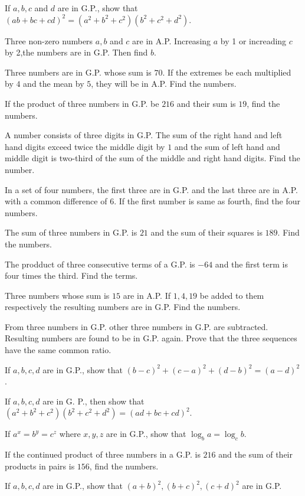 \item If $a, b, c$ and $d$ are in G.P., show that $(ab + bc + cd)^2 = (a^2 + b^2 + c^2)(b^2 + c^2 + d^2)$.
\item Three non-zero numbers $a, b$ and $c$ are in A.P. Increasing $a$ by 1 or increading $c$ by 2,the numbers are in G.P. Then
  find $b$.
\item Three numbers are in G.P. whose sum is $70$. If the extremes be each multiplied by $4$ and the mean by $5$, they will be in
  A.P. Find the numbers.
\item If the product of three numbers in G.P. be $216$ and their sum is $19$, find the numbers.
\item A number consists of three digits in G.P. The sum of the right hand and left hand digits exceed twice the middle digit by $1$
  and the sum of left hand and middle digit is two-third of the sum of the middle and right hand digits. Find the number.
\item In a set of four numbers, the first three are in G.P. and the last three are in A.P. with a common difference of $6$. If the
  first number is same as fourth, find the four numbers.
\item The sum of three numbers in G.P. is $21$ and the sum of their squares is $189$. Find the numbers.
\item The prodduct of three consecutive terms of a G.P. is $-64$ and the first term is four times the third. Find the terms.
\item Three numbers whose sum is $15$ are in A.P. If $1, 4, 19$ be added to them respectively the resulting numbers are in
  G.P. Find the numbers.
\item From three numbers in G.P. other three numbers in G.P. are subtracted. Resulting numbers are found to be in G.P. again. Prove
  that the three sequences have the same common ratio.
\item If $a, b, c, d$ are in G.P., show that $(b - c)^2 + (c - a)^2 + (d - b)^2 = (a - d)^2$.
\item If $a,b,c,d$ are in G. P., then show that $(a^2 + b^2 + c^2)(b^2 + c^2 + d^2) = (ad + bc + cd)^2$.
\item If $a^x = b^y = c^z$ where $x, y, z$ are in G.P., show that $\log_ba = \log_cb$.
\item If the continued product of three numbers in a G.P. is $216$ and the sum of their products in pairs is $156$, find the
  numbers.
\item If $a, b, c, d$ are in G.P., show that $(a + b)^2, (b + c)^2, (c + d)^2$ are in G.P.
